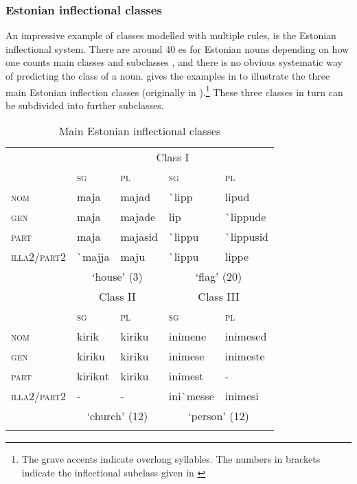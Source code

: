 \subsubsection{Estonian inflectional classes}

An impressive example of classes modelled with multiple rules, is the Estonian inflectional system. There are around 40 es for Estonian nouns depending on how one counts main classes and subclasses \autocites{Erelt.1995, Erelt.1997, Murk.1997, Blevins.2008}, and there is no obvious systematic way of predicting the class of a noun. \textcite[242]{Blevins.2008} gives the examples in  to illustrate the three main Estonian inflection classes (originally in \citealt{Erelt.2001}).\footnote{The grave accents indicate overlong syllables. The numbers in brackets indicate the inflectional subclass given in \autocite{Erelt.2001}} These three classes in turn can be subdivided into further subclasses.


\begin{table}
    \caption{Main Estonian inflectional classes}\label{tab:estonian-classes}
    \centering
    \begin{tabular}{lllll}
      \lsptoprule
      & \multicolumn{4}{c}{Class I}  \\

      & \textsc{sg}     & \textsc{pl} & \textsc{sg}  & \textsc{pl}          \\
      \midrule
      \textsc{nom}         & maja      & majad   & \`{}lipp  & lipud         \\
      \textsc{gen}         & maja      & majade  & lip       & \`{}lippude   \\
      \textsc{part}        & maja      & majasid & \`{}lippu & \`{}lippusid  \\
      \textsc{illa2/part2} & \`{}majja & maju    & \`{}lippu & lippe         \\
      \midrule
      & \multicolumn{2}{c}{`house' (3)} & \multicolumn{2}{c}{`flag' (20)}\\
      \midrule
      & \multicolumn{2}{c}{Class II} & \multicolumn{2}{c}{Class III}\\
      & \textsc{sg}     & \textsc{pl} & \textsc{sg}  & \textsc{pl}          \\
      \midrule
      \textsc{nom}         & kirik   & kiriku & inimene      & inimesed\\
      \textsc{gen}         & kiriku  & kiriku & inimese      & inimeste\\
      \textsc{part}        & kirikut & kiriku & inimest      & -       \\
      \textsc{illa2/part2} & -       & -      & ini\`{}messe & inimesi \\
      \midrule
       & \multicolumn{2}{c}{`church' (12)} & \multicolumn{2}{c}{`person' (12)} \\
      \lspbottomrule
  \end{tabular}
\end{table}

